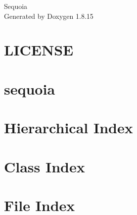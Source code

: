 \let\mypdfximage\pdfximage\def\pdfximage{\immediate\mypdfximage}\documentclass[twoside]{book}
\newcommand{\+}{\discretionary{\mbox{\scriptsize$\hookleftarrow$}}{}{}}
\newcommand{\clearemptydoublepage}{%
  \newpage{\pagestyle{empty}\cleardoublepage}%
}
\begin{document}
\hypersetup{pageanchor=false,
             bookmarksnumbered=true,
             pdfencoding=unicode
            }
\begin{titlepage}
\vspace*{7cm}
\begin{center}%
{\Large Sequoia }\\
\vspace*{1cm}
{\large Generated by Doxygen 1.8.15}\\
\end{center}
\end{titlepage}
\clearemptydoublepage
{}
\tableofcontents
\clearemptydoublepage
{}
\hypersetup{pageanchor=true}

\chapter{L\+I\+C\+E\+N\+SE}
\label{md__l_i_c_e_n_s_e}

\chapter{sequoia}
\label{md__r_e_a_d_m_e}

\chapter{Hierarchical Index}

\chapter{Class Index}

\chapter{File Index}

\end{document}
